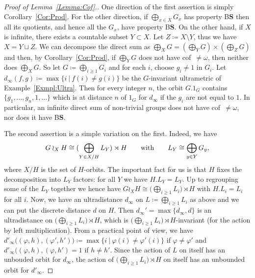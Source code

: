 \documentclass[a4paper]{article}
\theoremstyle{definition}
\newcommand*{\BS}{B$\mathbf{S}$}
\newcommand{\setst}[2]{\{#1\ |\ #2\}}
\begin{document}
\begin{proof}[Proof of Lemma~\ref{Lemma:Cof}.]
One direction of the first assertion is simply Corollary~\ref{Cor:Prod}.
For the other direction, if $\bigoplus_{x\in X}G_x$ has property \BS{} then all its quotients, and hence all the $G_x$, have property \BS.
On the other hand, if $X$ is infinite, there exists a countable subset $Y \subset X$. Let $Z \coloneqq X\setminus Y$, thus we have $X = Y \sqcup Z$. We can decompose the direct sum as $\bigoplus_XG = (\bigoplus_YG) \times (\bigoplus_ZG)$ and then, by Corollary~\ref{Cor:Prod}, if $\bigoplus_YG$ does not have cof~$\neq\omega$, then neither does $\bigoplus_XG$.
So let $G\coloneqq \bigoplus_{i\geq 1}G_i$ and for each $i$, choose $g_i\neq 1$ in $G_i$.
Let $d_\infty(f,g)\coloneqq\max\setst{i}{f(i)\neq g(i)}$ be the $G$-invariant ultrametric of Example~\ref{Exmpl:Ultra}.
Then for every integer $n$, the orbit $G.1_G$ contains $\{g_1,\dots,g_n,1,\dots\}$ which is at distance $n$ of $1_G$ for $d_\infty$ if the $g_i$ are not equal to $1$.
In particular, an infinite direct sum of non-trivial groups does not have cof~$\neq\omega$, nor does it have \BS.

The second assertion is a simple variation on the first.
Indeed, we have
\[
	G\wr_XH\cong(\bigoplus_{Y\in X/H}L_Y)\rtimes H\qquad\textnormal{with}\qquad L_Y\cong\bigoplus_{y\in Y}G_y,
\]
where $X/H$ is the set of $H$-orbits.
The important fact for us is that $H$ fixes the decomposition into $L_Y$ factors: for all $Y$ we have $H.L_Y=L_Y$.
Up to regrouping some of the $L_Y$ together we hence have $G\wr_XH\cong\bigl(\bigoplus_{i\geq 1}L_i\bigr)\rtimes H$ with $H.L_i=L_i$ for all $i$.
Now, we have an ultradistance $d_\infty$ on $L\coloneqq\bigoplus_{i\geq 1}L_i$ as above and we can put the discrete distance $d$ on $H$.
Then $d_\infty'=\max\{d_\infty,d\}$ is an ultradistance on $\bigl(\bigoplus_{i\geq 1}L_i\bigr)\rtimes H$, which is $\bigl(\bigoplus_{i\geq 1}L_i\bigr)\rtimes H$-invariant (for the action by left multiplication).
From a practical point of view, we have $d'_\infty\bigl((\varphi,h),(\varphi',h')\bigr)\coloneqq\max\setst{i}{\varphi(i)\neq \varphi'(i)}$ if $\varphi\neq \varphi'$ and $d'_\infty\bigl((\varphi,h),(\varphi,h')=1$ if $h\neq h'$.
Since the action of $L$ on itself has an unbouded orbit for $d_\infty$, the action of $\bigl(\bigoplus_{i\geq 1}L_i\bigr)\rtimes H$ on itself has an unbounded orbit for $d'_\infty$.
\end{proof}
\end{document}
